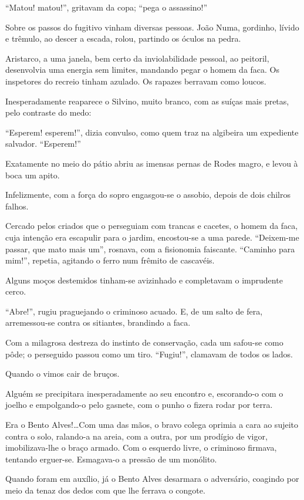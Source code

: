 ``Matou! matou!'', gritavam da copa; ``pega o assassino!''

Sobre os passos do fugitivo vinham diversas pessoas. João Numa,
gordinho, lívido e trêmulo, ao descer a escada, rolou, partindo os
óculos na pedra. 

Aristarco, a uma janela, bem certo da inviolabilidade
pessoal, ao peitoril, desenvolvia uma energia sem limites, mandando
pegar o homem da faca. Os inspetores do recreio tinham azulado. Os
rapazes berravam como loucos. 

Inesperadamente reaparece o Silvino,
muito branco, com as suíças mais pretas, pelo contraste do medo:

``Esperem! esperem!'', dizia convulso, como quem traz na algibeira um
expediente salvador. ``Esperem!'' 

Exatamente no meio do pátio abriu as
imensas pernas de Rodes magro, e levou à boca um apito. 

Infelizmente, com a força do sopro engasgou{}-se o assobio, 
depois de dois chilros falhos. 

Cercado pelos criados que o perseguiam com trancas e cacetes, o
homem da faca, cuja intenção era escapulir para o jardim, encostou{}-se
a uma parede. ``Deixem{}-me passar, que mato mais um'', rosnava, com a
fisionomia faiscante. ``Caminho para mim!'', repetia, agitando o ferro num
frêmito de cascavéis. 

Alguns moços destemidos tinham{}-se avizinhado e
completavam o imprudente cerco.

``Abre!'', rugiu praguejando o criminoso
acuado. E, de um salto de fera, arremessou{}-se contra os sitiantes,
brandindo a faca. 

Com a milagrosa destreza do instinto de conservação,
cada um safou{}-se como pôde; o perseguido passou como um tiro.
``Fugiu!'', clamavam de todos os lados. 

Quando o vimos cair de bruços.

Alguém se precipitara inesperadamente ao seu encontro e, escorando{}-o
com o joelho e empolgando{}-o pelo gasnete, com o punho o fizera rodar por
terra. 

Era o Bento Alves!\ldots Com uma das mãos, o bravo colega oprimia a
cara ao sujeito contra o solo, ralando{}-a na areia, com a outra, por
um prodígio de vigor, imobilizava{}-lhe o braço armado. Com o esquerdo
livre, o criminoso firmava, tentando erguer{}-se. Esmagava{}-o a
pressão de um monólito. 

Quando foram em auxílio, já o Bento Alves
desarmara o adversário, coagindo por meio da tenaz dos dedos com que
lhe ferrava o congote. 

